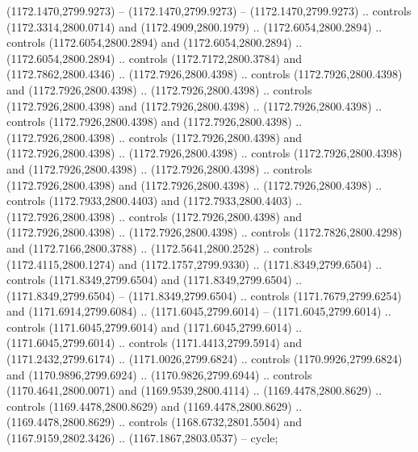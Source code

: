 \begin{scope}[shift={(296.85925,-6.26562)}]
\begin{scope}[shift={(-138.30846,-2572.6617)}]
\begin{scope}
\begin{scope}[cm={{0.8861,0.0,0.0,0.8861,(122.84989,319.1771)}}]
          (1172.1470,2799.9273) -- (1172.1470,2799.9273) -- (1172.1470,2799.9273) ..
          controls (1172.3314,2800.0714) and (1172.4909,2800.1979) ..
          (1172.6054,2800.2894) .. controls (1172.6054,2800.2894) and
          (1172.6054,2800.2894) .. (1172.6054,2800.2894) .. controls
          (1172.7172,2800.3784) and (1172.7862,2800.4346) .. (1172.7926,2800.4398) ..
          controls (1172.7926,2800.4398) and (1172.7926,2800.4398) ..
          (1172.7926,2800.4398) .. controls (1172.7926,2800.4398) and
          (1172.7926,2800.4398) .. (1172.7926,2800.4398) .. controls
          (1172.7926,2800.4398) and (1172.7926,2800.4398) .. (1172.7926,2800.4398) ..
          controls (1172.7926,2800.4398) and (1172.7926,2800.4398) ..
          (1172.7926,2800.4398) .. controls (1172.7926,2800.4398) and
          (1172.7926,2800.4398) .. (1172.7926,2800.4398) .. controls
          (1172.7926,2800.4398) and (1172.7926,2800.4398) .. (1172.7926,2800.4398) ..
          controls (1172.7933,2800.4403) and (1172.7933,2800.4403) ..
          (1172.7926,2800.4398) .. controls (1172.7926,2800.4398) and
          (1172.7926,2800.4398) .. (1172.7926,2800.4398) .. controls
          (1172.7826,2800.4298) and (1172.7166,2800.3788) .. (1172.5641,2800.2528) ..
          controls (1172.4115,2800.1274) and (1172.1757,2799.9330) ..
          (1171.8349,2799.6504) .. controls (1171.8349,2799.6504) and
          (1171.8349,2799.6504) .. (1171.8349,2799.6504) -- (1171.8349,2799.6504) ..
          controls (1171.7679,2799.6254) and (1171.6914,2799.6084) ..
          (1171.6045,2799.6014) -- (1171.6045,2799.6014) .. controls
          (1171.6045,2799.6014) and (1171.6045,2799.6014) .. (1171.6045,2799.6014) ..
          controls (1171.4413,2799.5914) and (1171.2432,2799.6174) ..
          (1171.0026,2799.6824) .. controls (1170.9926,2799.6824) and
          (1170.9896,2799.6924) .. (1170.9826,2799.6944) .. controls
          (1170.4641,2800.0071) and (1169.9539,2800.4114) .. (1169.4478,2800.8629) ..
          controls (1169.4478,2800.8629) and (1169.4478,2800.8629) ..
          (1169.4478,2800.8629) .. controls (1168.6732,2801.5504) and
          (1167.9159,2802.3426) .. (1167.1867,2803.0537) -- cycle;


\end{scope}
\end{scope}
\end{scope}
\end{scope}
